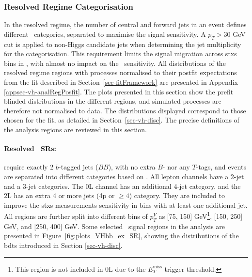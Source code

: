 \subsubsection{Resolved Regime Categorisation}
In the resolved regime, the number of central and forward jets in an event defines different \nj\ categories, separated to maximise the signal sensitivity. A $p_T > 30$ GeV cut is applied to non-Higgs candidate jets when determining the jet multiplicity for the categorisation. This requirement limits the signal migration across \gls{stxs} bins in \vhb, with almost no impact on the \vhc\ sensitivity. All distributions of the resolved regime regions with processes normalised to their postfit expectations from the fit described in Section~\ref{sec-fitFramework} are presented in Appendix \ref{appsec-vh-analRegPosfit}. The plots presented in this section show the prefit blinded distributions in the different regions, and simulated processes are therefore not normalised to data. The distributions displayed correspond to those chosen for the fit, as detailed in Section~\ref{sec-vh-disc}. The precise definitions of the analysis regions are reviewed in this section.

\paragraph{Resolved \boldvhb\ SRs:} require exactly 2 $b$-tagged jets ($BB$), with no extra $B$- nor any $T$-tags, and events are separated into different categories based on \nj. All lepton channels have a 2-jet and a 3-jet categories. The 0L channel has an additional 4-jet category, and the 2L has an extra 4 or more jets (4p or $\geq$4) category. They are included to improve the \gls{stxs} measurements sensitivity in bins with at least one additional jet. All regions are further split into different bins of $p_T^V$ as [75, 150] GeV\footnote{This region is not included in 0L due to the $E_T^{\textrm{miss}}$ trigger threshold.}, [150, 250] GeV, and [250, 400] GeV. Some selected \vhb\ signal regions in the analysis are presented in Figure~\ref{fig:plots_VHbb_ex_SR}, showing the distributions of the \glspl{bdt} introduced in Section \ref{sec-vh-disc}. 

